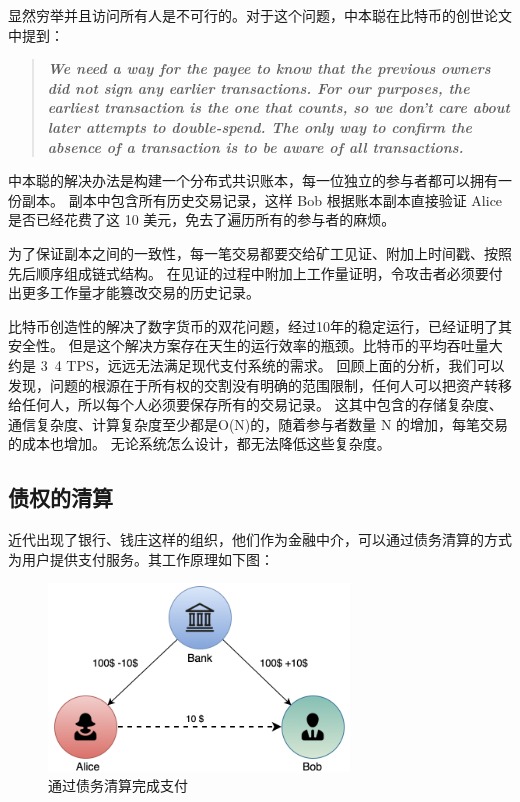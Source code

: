 显然穷举并且访问所有人是不可行的。对于这个问题，中本聪在比特币的创世论文中提到：

\begin{quote}
    \textbf{\textit{We need a way for the payee to know that the previous owners did not sign any earlier transactions. 
            For our purposes, the earliest transaction is the one that counts, so we don't care about later attempts to double-spend. 
            The only way to confirm the absence of a transaction is to be aware of all transactions.}}
\end{quote}

中本聪的解决办法是构建一个分布式共识账本，每一位独立的参与者都可以拥有一份副本。
副本中包含所有历史交易记录，这样 Bob 根据账本副本直接验证 Alice 是否已经花费了这 10 美元，免去了遍历所有的参与者的麻烦。

为了保证副本之间的一致性，每一笔交易都要交给矿工见证、附加上时间戳、按照先后顺序组成链式结构。
在见证的过程中附加上工作量证明，令攻击者必须要付出更多工作量才能篡改交易的历史记录。


比特币创造性的解决了数字货币的双花问题，经过10年的稳定运行，已经证明了其安全性。
但是这个解决方案存在天生的运行效率的瓶颈。比特币的平均吞吐量大约是 3~4 TPS，远远无法满足现代支付系统的需求。
回顾上面的分析，我们可以发现，问题的根源在于所有权的交割没有明确的范围限制，任何人可以把资产转移给任何人，所以每个人必须要保存所有的交易记录。
这其中包含的存储复杂度、通信复杂度、计算复杂度至少都是O(N)的，随着参与者数量 N 的增加，每笔交易的成本也增加。
无论系统怎么设计，都无法降低这些复杂度。

\subsection{债权的清算}

近代出现了银行、钱庄这样的组织，他们作为金融中介，可以通过债务清算的方式为用户提供支付服务。其工作原理如下图：

\begin{figure}[h!]
    \centering
    \includegraphics[width=8cm, keepaspectratio]{../images/clearing.png}
    \caption{通过债务清算完成支付}
    \label{fig:clearing}
\end{figure}

